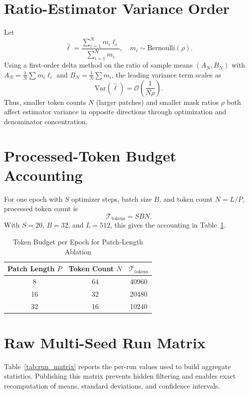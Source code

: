 \documentclass[conference]{IEEEtran}
\begin{document}
\appendices
\section{Ratio-Estimator Variance Order}
Let
\begin{equation}
\hat{\ell} = \frac{\sum_{i=1}^{N} m_i \ell_i}{\sum_{i=1}^{N} m_i}, \quad m_i\sim\mathrm{Bernoulli}(\rho).
\end{equation}
Using a first-order delta method on the ratio of sample means $(A_N,B_N)$ with $A_N=\frac{1}{N}\sum m_i\ell_i$ and $B_N=\frac{1}{N}\sum m_i$, the leading variance term scales as
\begin{equation}
\mathrm{Var}(\hat{\ell}) = \mathcal{O}\!\left(\frac{1}{N\rho}\right).
\label{eq:ratio_var_order}
\end{equation}
Thus, smaller token counts $N$ (larger patches) and smaller mask ratios $\rho$ both affect estimator variance in opposite directions through optimization and denominator concentration.

\section{Processed-Token Budget Accounting}
For one epoch with $S$ optimizer steps, batch size $B$, and token count $N=L/P$, processed token count is
\begin{equation}
\mathcal{T}_{\text{tokens}} = S B N.
\end{equation}
With $S=20$, $B=32$, and $L=512$, this gives the accounting in Table~\ref{tab:token_budget}.

\begin{table}[t]
\caption{Token Budget per Epoch for Patch-Length Ablation}
\label{tab:token_budget}
\centering
\begin{tabular}{ccc}
\toprule
Patch Length $P$ & Token Count $N$ & $\mathcal{T}_{\text{tokens}}$ \\
\midrule
8  & 64 & 40960 \\
16 & 32 & 20480 \\
32 & 16 & 10240 \\
\bottomrule
\end{tabular}
\end{table}

\section{Raw Multi-Seed Run Matrix}
Table~\ref{tab:run_matrix} reports the per-run values used to build aggregate statistics. Publishing this matrix prevents hidden filtering and enables exact recomputation of means, standard deviations, and confidence intervals.
\end{document}

